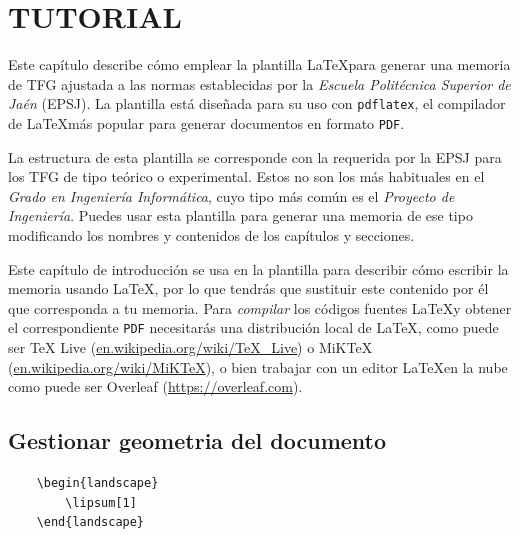 
\chapter{TUTORIAL}

Este capítulo describe cómo emplear la plantilla \LaTeX para generar una memoria de TFG ajustada a las normas establecidas por la \textit{Escuela Politécnica Superior de Jaén} (EPSJ). La plantilla está diseñada para su uso con \verb*|pdflatex|, el compilador de \LaTeX más popular para generar documentos en formato \verb*|PDF|.

La estructura de esta plantilla se corresponde con la requerida por la EPSJ para los TFG de tipo teórico o experimental. Estos no son los más habituales en el \textit{Grado en Ingeniería Informática}, cuyo tipo más común es el \textit{Proyecto de Ingeniería}. Puedes usar esta plantilla para generar una memoria de ese tipo modificando los nombres y contenidos de los capítulos y secciones.

Este capítulo de introducción se usa en la plantilla para describir cómo escribir la memoria usando \LaTeX, por lo que tendrás que sustituir este contenido por él que corresponda a tu memoria. Para \textit{compilar} los códigos fuentes \LaTeX y obtener el correspondiente \verb*|PDF| necesitarás una distribución local de \LaTeX, como puede ser TeX Live (\url{en.wikipedia.org/wiki/TeX\_Live}) o MiKTeX (\url{en.wikipedia.org/wiki/MiKTeX}), o bien trabajar con un editor \LaTeX en la nube como puede ser Overleaf (\url{https://overleaf.com}).

\section{Gestionar geometria del documento}

\begin{verbatim}
    \begin{landscape}
        \lipsum[1]
    \end{landscape}
\end{verbatim}

\begin{landscape}
    \lipsum[1]
\end{landscape}

